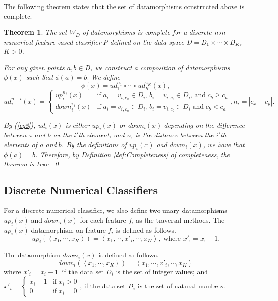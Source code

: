 \documentclass[preprint,1p,authoryear,times]{elsarticle}
\newtheorem{Theorem} {Theorem}
\begin{document}
The following theorem states that the set of datamorphisms constructed above is complete. 

\begin{Theorem}\label{thm:Thm2_2}
The set $W_D$ of datamorphisms is complete for a discrete non-numerical feature based classifier $P$ defined on the data space $D = D_1 \times \cdots \times D_K$, $K>0$.  

For any given points $a, b \in D$, we construct a composition of datamorphisms $\phi(x)$ such that $\phi(a) = b$. 
We define 
\begin{equation}
\phi(x) = ud^{n_1}_1 \circ \cdots \circ ud^{n_K}_K(x), 
\end{equation}
\begin{equation}
ud^{n-i}_i(x) = \left\{ \begin{array}{ll}
up^{n_i}_i(x) & \textrm{if  $a_i=v_{i,c_a}\in D_i$, $b_i=v_{i,c_b} \in D_i$, and $c_b \geq c_a$}\\ \label{eq8}
down^{n_i}_i(x) & \textrm{if $a_i=v_{i,c_a}\in D_i$, $b_i=v_{i,c_b} \in D_i$ and $c_b < c_a$}
\end{array} \right., n_i = |c_x -c_y|.
\end{equation}

By (\ref{eq8}), $ud_i(x)$ is either $up_i(x)$ or $down_i(x)$ depending on the difference between $a$ and $b$ on the $i'$th element, and $n_i$ is the distance between the $i'$th elements of $a$ and $b$. By the definitions of $up_i(x)$ and $down_i(x)$, we have that $\phi(a)=b$. Therefore, by Definition \ref{def:Completeness} of completeness, the theorem is true. \qed
\end{Theorem}

\subsection{Discrete Numerical Classifiers}

For a discrete numerical classifier, we also define two unary datamorphisms $up_i(x)$ and $down_i(x)$ for each feature $f_i$ as the traversal methods. The $up_i(x)$ datamorphism on feature $f_i$ is defined as follows. 
\begin{equation}
up_i(\left<x_1, \cdots, x_K\right>)=\left<x_1, \cdots, x'_i, \cdots, x_K\right>,
\textrm{ where } x'_i = x_i + 1. 
\label{eqn:e2_4}
\end{equation} 

The datamorphism $down_i(x)$ is defined as follows.
\begin{equation}
down_i(\left<x_1, \cdots, x_K\right>)=\left<x_1, \cdots, x'_i, \cdots, x_K\right>
\label{eqn:e2_5}
\end{equation}
where $x'_i = x_i - 1$, if the data set $D_i$ is the set of integer values; and 
$x'_i = \left\{ \begin{array}{ll} 
x_i - 1 & \textrm{if $x_i>0$}\\
0 & \textrm{if $x_i=0$}
\end{array}
\right.$, 
if the data set $D_i$ is the set of natural numbers. 
\end{document}
